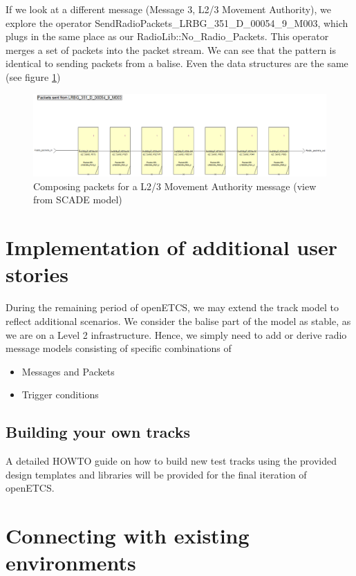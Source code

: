 \documentclass{template/openetcs_article}
\begin{document}
If we look at a different message (Message 3, L2/3 Movement Authority), we explore the operator SendRadioPackets\_LRBG\_351\_D\_00054\_9\_M003, which plugs in the same place as our RadioLib::No\_Radio\_Packets. This operator merges a set of packets into the packet stream. We can see that the pattern is identical to sending packets from a balise. Even the data structures are the same (see figure \ref{fig:m3})

\begin{figure}[H]
  \centering
  \includegraphics[width=6.5in]{images/RM3.eps}
   \caption{Composing packets for a L2/3 Movement Authority message (view from SCADE model)}
  \label{fig:m3}
\end{figure}


\section{Implementation of additional user stories}

During the remaining period of openETCS, we may extend the track model to reflect additional scenarios.
We consider the balise part of the model as stable, as we are on a Level 2 infrastructure.\newline
Hence, we simply need to add or derive radio message models consisting of specific combinations of
\begin{itemize}
 \item Messages and Packets
 \item Trigger conditions
\end{itemize}

\subsection{Building your own tracks}

A detailed HOWTO guide on how to build new test tracks using the provided design templates and libraries will be provided for the final iteration of openETCS.

\section{Connecting with existing environments}
\end{document}
